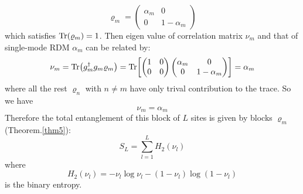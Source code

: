 \documentclass[11pt]{article}
\theoremstyle{remark}
\theoremstyle{definition}
\newcommand{\todo}[1]{\textcolor{red}{TODO: #1}}
\begin{document}
\begin{equation}
	\varrho_m = 
	\begin{pmatrix}
		\alpha_m & 0 \\ 0 & 1 - \alpha_m
	\end{pmatrix}
\end{equation}
which satisfies $\Tr(\varrho_m) = 1$.  
Then eigen value of correlation matrix $\nu_m$ and that of single-mode RDM $\alpha_m$ can be related by:
\begin{equation}
	\nu_m = \Tr(g_m^\dagger g_m \varrho_m) = \Tr[
	\begin{pmatrix}
		1 & 0 \\ 0 & 0
	\end{pmatrix}
	\begin{pmatrix}
		\alpha_m & 0 \\ 0 & 1 - \alpha_m
	\end{pmatrix}
	] = \alpha_m
\end{equation}
where all the rest $\varrho_n$ with $n\neq m$ have only trival contribution to the trace. So we have
\begin{equation}
	\nu_m = \alpha_m
\end{equation}
Therefore the total entanglement of this block of $L$ sites is given by blocks $\varrho_m$ (Theorem.\ref{thm5}):
\begin{equation}
	S_L = \sum_{l=1}^L H_2(\nu_l) 
\end{equation}
where
\begin{equation}
	H_2(\nu_l) = - \nu_l \log \nu_l - (1 - \nu_l)\log(1 - \nu_l)
\end{equation}
is the binary entropy.



%
\end{document}
